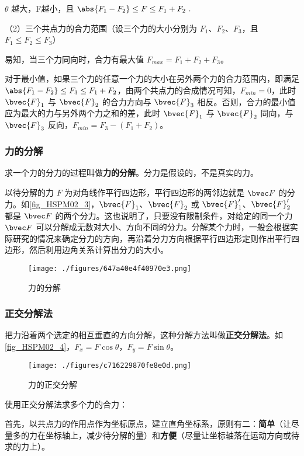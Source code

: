 $\theta$ 越大，F越小，且 $\abs{F_1-F_2}\leq F\leq F_1+F_2~.$

（2）三个共点力的合力范围（设三个力的大小分别为 $F_1$、$F_2$、$F_3$，且 $F_1\leq F_2 \leq F_3$）

易知，当三个力同向时，合力有最大值 $F_{max}=F_1+F_2+F_3$。

对于最小值，如果三个力的任意一个力的大小在另外两个力的合力范围内，即满足 $\abs{F_1-F_2}\leq F_3\leq F_1+F_2$，由两个共点力的合成情况可知，$F_{min}=0$，此时 $\bvec {F}_1$ 与 $\bvec {F}_2$ 的合力方向与 $\bvec {F}_3$ 相反。否则，合力的最小值应为最大的力与另外两个力之和的差，此时 $\bvec {F}_1$ 与 $\bvec {F}_2$ 同向，与 $\bvec {F}_3$ 反向，$F_{min}=F_3-(F_1+F_2)$。

\subsubsection{力的分解}
求一个力的分力的过程叫做\textbf{力的分解}。分力是假设的，不是真实的力。

以待分解的力 $F$ 为对角线作平行四边形，平行四边形的两邻边就是 $\bvec F$ 的分力。如\autoref{fig_HSPM02_3}，$\bvec {F}_1$、$\bvec {F}_2$ 或 $\bvec {F}_1'$、$\bvec {F}_2'$ 都是 $\bvec F$ 的两个分力。这也说明了，只要没有限制条件，对给定的同一个力 $\bvec F$ 可以分解成无数对大小、方向不同的分力。分解某个力时，一般会根据实际研究的情况来确定分力的方向，再沿着分力方向根据平行四边形定则作出平行四边形，然后利用边角关系计算出分力的大小。
\begin{figure}[ht]
\centering
\texttt{[image: ./figures/647a40e4f40970e3.png]}
\caption{力的分解} \label{fig_HSPM02_3}
\end{figure}

\subsubsection{正交分解法}
把力沿着两个选定的相互垂直的方向分解，这种分解方法叫做\textbf{正交分解法}。如\autoref{fig_HSPM02_4}，$F_{x}=F\cos\theta$，$F_{y}=F\sin\theta$。
\begin{figure}[ht]
\centering
\texttt{[image: ./figures/c716229870fe8e0d.png]}
\caption{力的正交分解} \label{fig_HSPM02_4}
\end{figure}

使用正交分解法求多个力的合力：

首先，以共点力的作用点作为坐标原点，建立直角坐标系，原则有二：\textbf{简单}（让尽量多的力在坐标轴上，减少待分解的量）和\textbf{方便}（尽量让坐标轴落在运动方向或待求的力上）。

